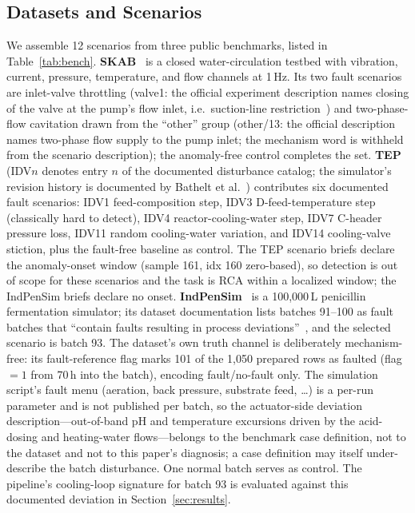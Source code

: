 \documentclass[preprint,12pt]{elsarticle}
\begin{document}
\subsection{Datasets and Scenarios}
We assemble 12 scenarios from three public benchmarks, listed in Table~\ref{tab:bench}. \textbf{SKAB}~\cite{skab2020} is a closed water-circulation testbed with vibration, current, pressure, temperature, and flow channels at 1\,Hz. Its two fault scenarios are inlet-valve throttling (valve1: the official experiment description names closing of the valve at the pump's flow inlet, i.e.\ suction-line restriction~\cite{skab2020}) and two-phase-flow cavitation drawn from the ``other'' group (other/13: the official description names two-phase flow supply to the pump inlet; the mechanism word is withheld from the scenario description); the anomaly-free control completes the set. \textbf{TEP}~\cite{downs1993plant,lyman1995plant,rieth2017additional} (IDV$n$ denotes entry $n$ of the documented disturbance catalog; the simulator's revision history is documented by Bathelt et al.~\cite{bathelt2015revision}) contributes six documented fault scenarios: IDV1 feed-composition step, IDV3 D-feed-temperature step (classically hard to detect), IDV4 reactor-cooling-water step, IDV7 C-header pressure loss, IDV11 random cooling-water variation, and IDV14 cooling-valve stiction, plus the fault-free baseline as control. The TEP scenario briefs declare the anomaly-onset window (sample 161, idx 160 zero-based), so detection is out of scope for these scenarios and the task is RCA within a localized window; the IndPenSim briefs declare no onset. \textbf{IndPenSim}~\cite{goldrick2015development,goldrick2019modern} is a 100{,}000\,L penicillin fermentation simulator; its dataset documentation lists batches 91--100 as fault batches that ``contain faults resulting in process deviations''~\cite{goldrick2019modern}, and the selected scenario is batch 93. The dataset's own truth channel is deliberately mechanism-free: its fault-reference flag marks 101 of the 1,050 prepared rows as faulted (flag $=1$ from 70\,h into the batch), encoding fault/no-fault only. The simulation script's fault menu (aeration, back pressure, substrate feed, \dots) is a per-run parameter and is not published per batch, so the actuator-side deviation description---out-of-band pH and temperature excursions driven by the acid-dosing and heating-water flows---belongs to the benchmark case definition, not to the dataset and not to this paper's diagnosis; a case definition may itself under-describe the batch disturbance. One normal batch serves as control. The pipeline's cooling-loop signature for batch 93 is evaluated against this documented deviation in Section~\ref{sec:results}. 
\end{document}
